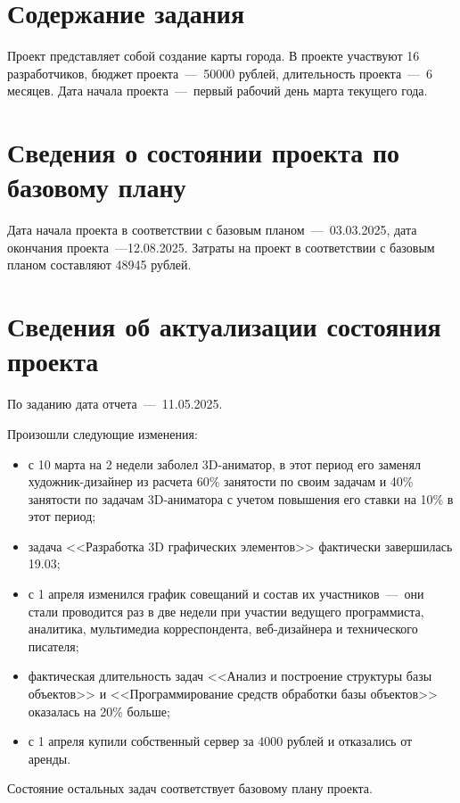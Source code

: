 \setcounter{page}{2}

\section{Содержание задания}
Проект представляет собой создание карты города.
В проекте участвуют 16 разработчиков, бюджет проекта~---~50000 рублей, длительность проекта~---~6 месяцев.
Дата начала проекта~---~первый рабочий день марта текущего года.

\section{Сведения о состоянии проекта по базовому плану}

Дата начала проекта в соответствии с базовым планом~---~03.03.2025, дата окончания проекта~---12.08.2025.
Затраты на проект в соответствии с базовым планом составляют 48945 рублей. 

\section{Сведения об актуализации состояния проекта}

По заданию дата отчета~---~11.05.2025.

Произошли следующие изменения:

\begin{itemize}[label=---]
	\item с 10 марта на 2 недели заболел 3D-аниматор, в этот период его заменял художник-дизайнер из расчета 60\% занятости по своим задачам и 40\% занятости по задачам 3D-аниматора с учетом повышения его ставки на 10\% в этот период;
	\item задача <<Разработка 3D графических элементов>> фактически завершилась 19.03;
	\item с 1 апреля изменился график совещаний и состав их участников~---~они стали проводится раз в две недели при участии ведущего программиста, аналитика, мультимедиа корреспондента, веб-дизайнера и технического писателя;
	\item фактическая длительность задач <<Анализ и построение структуры базы объектов>> и <<Программирование средств обработки базы объектов>> оказалась на 20\% больше;
	\item с 1 апреля купили собственный сервер за 4000 рублей и отказались от аренды.
\end{itemize}

Состояние остальных задач соответствует базовому плану проекта.

